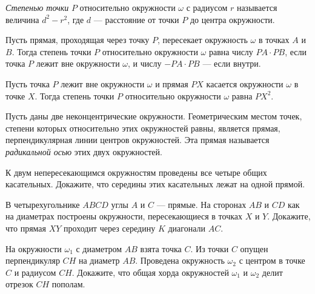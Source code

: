 \resetproblem \begingroup %
    \def\jeolmdate{16 ноября 2018 г.}%
    \def\jeolmauthors{Доледенок А.\,В., Орлов О.\,П.}%
\jeolmheader \endgroup


 \textit{Степенью точки} $P$ относительно окружности $\omega$ с радиусом $r$ называется величина $d^2 - r^2$, где $d$ --- расстояние от точки $P$ до центра окружности.

 Пусть прямая, проходящая через точку $P$, пересекает окружность $\omega$ в точках $A$ и $B$. Тогда степень точки $P$ относительно окружности $\omega$ равна числу $PA \cdot PB$, если точка $P$ лежит вне окружности $\omega$, и числу $-PA \cdot PB$ --- если внутри.

 Пусть точка $P$ лежит вне окружности $\omega$ и прямая $PX$ касается окружности $\omega$ в точке $X$. Тогда степень точки $P$ относительно окружности $\omega$ равна $PX^2$.

 Пусть даны две неконцентрические окружности. Геометрическим местом точек, степени которых относительно этих окружностей равны, является прямая, перпендикулярная линии центров окружностей. Эта прямая называется \textit{радикальной осью} этих двух окружностей. 



\begin{problems}

\item К двум непересекающимся окружностям проведены все четыре общих касательных. Докажите, что середины этих касательных лежат на одной прямой.

\item В четырехугольнике $ABCD$ углы $A$  и $C$ --- прямые. На сторонах $AB$ и $CD$ как на диаметрах построены  окружности,  пересекающиеся  в  точках $X$ и $Y$.  Докажите,  что  прямая $XY$ проходит через середину $K$ диагонали $AC$.

\item На окружности $\omega_1$ с диаметром $AB$ взята точка $C$. Из точки $C$ опущен перпендикуляр $CH$ на диаметр $AB$. Проведена окружность $\omega_2$ с центром в точке $C$ и радиусом $CH$. Докажите, что общая хорда окружностей $\omega_1$ и $\omega_2$ делит отрезок $CH$ пополам.

\end{problems}

